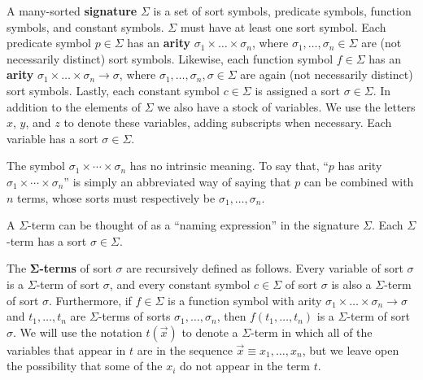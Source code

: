 \begin{defn} A many-sorted \textbf{signature} $\Sigma$ is a set of
  sort symbols, predicate symbols, function symbols, and constant
  symbols. $\Sigma$ must have at least one sort symbol.  Each
  predicate symbol $p\in\Sigma$ has an \textbf{arity}
  $\sigma_1\times\ldots\times\sigma_n$, where
  $\sigma_1,\ldots, \sigma_n\in\Sigma$ are (not necessarily distinct)
  sort symbols.  Likewise, each function symbol $f\in\Sigma$ has an
  \textbf{arity}
  $\sigma_1\times\ldots\times\sigma_n\rightarrow\sigma$, where
  $\sigma_1,\ldots, \sigma_n,\sigma\in\Sigma$ are again (not
  necessarily distinct) sort symbols. Lastly, each constant symbol
  $c\in\Sigma$ is assigned a sort $\sigma\in\Sigma$. In addition to
  the elements of $\Sigma$ we also have a stock of variables. We use
  the letters $x$, $y$, and $z$ to denote these variables, adding
  subscripts when necessary. Each variable has a sort
  $\sigma\in\Sigma$. \end{defn}

\begin{note} The symbol $\sigma _1\times \cdots \times \sigma _n$ has
  no intrinsic meaning.  To say that, ``$p$ has arity
  $\sigma _1\times \cdots \times \sigma _n$'' is simply an abbreviated
  way of saying that $p$ can be combined with $n$ terms, whose sorts
  must respectively be $\sigma _1,\dots ,\sigma _n$. \end{note}

A $\Sigma$-term can be thought of as a ``naming expression'' in the
signature $\Sigma$. Each $\Sigma$-term has a sort $\sigma\in\Sigma$.

\begin{defn} The \textbf{$\mathbf{\Sigma}$-terms} of sort $\sigma$ are
  recursively defined as follows. Every variable of sort $\sigma$ is a
  $\Sigma$-term of sort $\sigma$, and every constant symbol
  $c\in\Sigma$ of sort $\sigma$ is also a $\Sigma$-term of sort
  $\sigma$. Furthermore, if $f\in\Sigma$ is a function symbol with
  arity $\sigma_1\times\ldots\times\sigma_n\rightarrow\sigma$ and
  $t_1,\ldots, t_n$ are $\Sigma$-terms of sorts
  $\sigma_1, \ldots, \sigma_n$, then $f(t_1,\ldots, t_n)$ is a
  $\Sigma$-term of sort $\sigma$. We will use the notation
  $t(\vec{x})$ to denote a $\Sigma$-term in which all of the variables
  that appear in $t$ are in the sequence
  $\vec{x}\equiv x_1,\ldots, x_n$, but we leave open the possibility
  that some of the $x_i$ do not appear in the term $t$. \end{defn}

